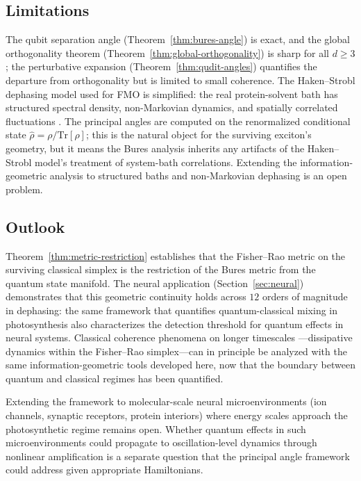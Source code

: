\documentclass[12pt,a4paper]{article}
\theoremstyle{definition}
\theoremstyle{remark}
\begin{document}
\subsection{Limitations}

The qubit separation angle (Theorem~\ref{thm:bures-angle}) is exact, and the global orthogonality theorem (Theorem~\ref{thm:global-orthogonality}) is sharp for all $d \geq 3$; the perturbative expansion (Theorem~\ref{thm:qudit-angles}) quantifies the departure from orthogonality but is limited to small coherence. The Haken--Strobl dephasing model used for FMO is simplified: the real protein-solvent bath has structured spectral density, non-Markovian dynamics, and spatially correlated fluctuations \cite{cao2020quantum}. The principal angles are computed on the renormalized conditional state $\hat{\rho} = \rho/\mathrm{Tr}[\rho]$; this is the natural object for the surviving exciton's geometry, but it means the Bures analysis inherits any artifacts of the Haken--Strobl model's treatment of system-bath correlations. Extending the information-geometric analysis to structured baths and non-Markovian dephasing is an open problem.

\subsection{Outlook}
\label{sec:bridge}

Theorem~\ref{thm:metric-restriction} establishes that the Fisher--Rao metric on the surviving classical simplex is the restriction of the Bures metric from the quantum state manifold. The neural application (Section~\ref{sec:neural}) demonstrates that this geometric continuity holds across $12$ orders of magnitude in dephasing: the same framework that quantifies quantum-classical mixing in photosynthesis also characterizes the detection threshold for quantum effects in neural systems. Classical coherence phenomena on longer timescales \cite{todd2026coherence,todd2026intelligence}---dissipative dynamics within the Fisher--Rao simplex---can in principle be analyzed with the same information-geometric tools developed here, now that the boundary between quantum and classical regimes has been quantified.

Extending the framework to molecular-scale neural microenvironments (ion channels, synaptic receptors, protein interiors) where energy scales approach the photosynthetic regime remains open. Whether quantum effects in such microenvironments could propagate to oscillation-level dynamics through nonlinear amplification is a separate question that the principal angle framework could address given appropriate Hamiltonians.
\end{document}

